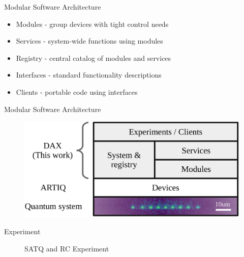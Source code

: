 \documentclass[18 pt]{beamer}
\begin{document}
\begin{frame}{Modular Software Architecture}
\begin{itemize}
\item Modules - group devices with tight control needs
\item Services - system-wide functions using modules
\item Registry - central catalog of modules and services
\item Interfaces - standard functionality descriptions
\item Clients - portable code using interfaces
\end{itemize}
\end{frame}
\begin{frame}{Modular Software Architecture}
  \begin{figure}
    \includegraphics[width=.8\textwidth]{overivew.png}
  \end{figure}
\end{frame}
\begin{frame}{Experiment}
  \begin{figure}
    \caption{SATQ and RC Experiment}
  \end{figure}
\end{frame}
\end{document}
